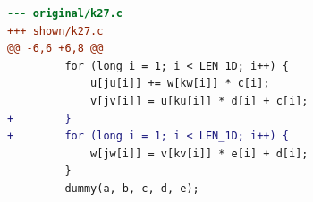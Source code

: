 \begin{lstlisting}[language=diff,basicstyle=\ttfamily\scriptsize,breaklines=true,caption={tsvc_c2/k27 — no-change (e2v6_agent_2) — shown: a rewrite the gate rejected at 'correctness'}]
--- original/k27.c
+++ shown/k27.c
@@ -6,6 +6,8 @@
         for (long i = 1; i < LEN_1D; i++) {
             u[ju[i]] += w[kw[i]] * c[i];
             v[jv[i]] = u[ku[i]] * d[i] + c[i];
+        }
+        for (long i = 1; i < LEN_1D; i++) {
             w[jw[i]] = v[kv[i]] * e[i] + d[i];
         }
         dummy(a, b, c, d, e);
\end{lstlisting}
